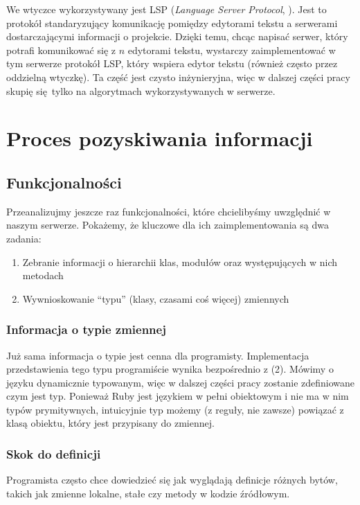 \documentclass[shortabstract,mgr]{iithesis}
\begin{document}
We wtyczce wykorzystywany jest LSP (\textit{Language Server Protocol}, \cite{LSP}).
Jest to protokół standaryzujący komunikację pomiędzy edytorami tekstu a serwerami dostarczającymi informacji o projekcie.
Dzięki temu, chcąc napisać serwer, który potrafi komunikować się z $n$ edytorami tekstu, wystarczy zaimplementować w tym serwerze protokół LSP, który wspiera edytor tekstu (również często przez oddzielną wtyczkę). Ta część jest czysto inżynieryjna, więc w dalszej części pracy skupię się tylko na algorytmach wykorzystywanych w serwerze.

\section{Proces pozyskiwania informacji}

\subsection{Funkcjonalności}

Przeanalizujmy jeszcze raz funkcjonalności, które chcielibyśmy uwzględnić w naszym serwerze. Pokażemy, że kluczowe  dla ich zaimplementowania są dwa zadania:
\begin{enumerate}
\item Zebranie informacji o hierarchii klas, modułów oraz występujących w nich metodach
\item Wywnioskowanie ``typu'' (klasy, czasami coś więcej) zmiennych
\end{enumerate}

\subsubsection{Informacja o typie zmiennej}

Już sama informacja o typie jest cenna dla programisty. Implementacja przedstawienia tego typu programiście wynika bezpośrednio z (2).
Mówimy o języku dynamicznie typowanym, więc w dalszej części pracy zostanie zdefiniowane czym jest typ. Ponieważ Ruby jest językiem w pełni obiektowym i nie ma w nim typów prymitywnych, intuicyjnie typ możemy (z reguły, nie zawsze) powiązać z klasą obiektu, który jest przypisany do zmiennej.

\subsubsection{Skok do definicji}

Programista często chce dowiedzieć się jak wyglądają definicje różnych bytów, takich jak zmienne lokalne, stałe czy metody w kodzie źródłowym.
\end{document}
